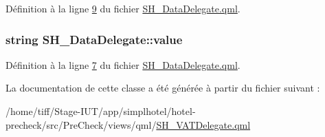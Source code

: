 Définition à la ligne \hyperlink{SH__DataDelegate_8qml_source_l00009}{9} du fichier \hyperlink{SH__DataDelegate_8qml_source}{S\-H\-\_\-\-Data\-Delegate.\-qml}.

\hypertarget{classSH__DataDelegate_acb9da3c73493c88865e08d9575f26482}{
\subsubsection[{value}]{\setlength{\rightskip}{0pt plus 5cm}string S\-H\-\_\-\-Data\-Delegate\-::value\hspace{0.3cm}{\ttfamily [inherited]}}}\label{classSH__DataDelegate_acb9da3c73493c88865e08d9575f26482}


Définition à la ligne \hyperlink{SH__DataDelegate_8qml_source_l00007}{7} du fichier \hyperlink{SH__DataDelegate_8qml_source}{S\-H\-\_\-\-Data\-Delegate.\-qml}.



La documentation de cette classe a été générée à partir du fichier suivant \-:\begin{DoxyCompactItemize}
\item 
/home/tiff/\-Stage-\/\-I\-U\-T/app/simplhotel/hotel-\/precheck/src/\-Pre\-Check/views/qml/\hyperlink{SH__VATDelegate_8qml}{S\-H\-\_\-\-V\-A\-T\-Delegate.\-qml}\end{DoxyCompactItemize}
